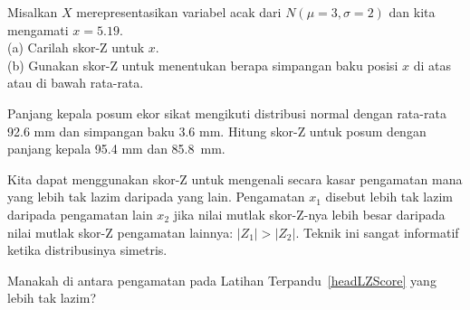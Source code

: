 \begin{exercisewrap}
\begin{nexercise}
Misalkan $X$ merepresentasikan variabel acak dari
$N(\mu=3, \sigma=2)$ dan kita mengamati $x=5.19$. \\
(a)
    Carilah skor-Z untuk $x$. \\
(b)
    Gunakan skor-Z untuk menentukan berapa simpangan baku posisi $x$
    di atas atau di bawah rata-rata.\footnotemark{}
\end{nexercise}
\end{exercisewrap}

\begin{exercisewrap}
\begin{nexercise} \label{headLZScore}
Panjang kepala posum ekor sikat mengikuti distribusi normal
dengan rata-rata 92.6 mm dan simpangan baku 3.6 mm.
Hitung skor-Z untuk posum dengan panjang kepala 95.4 mm
dan 85.8~mm.\footnotemark{}
\end{nexercise}
\end{exercisewrap}

Kita dapat menggunakan skor-Z untuk mengenali secara kasar
pengamatan mana yang lebih tak lazim daripada yang lain.
Pengamatan $x_1$ disebut lebih tak lazim daripada pengamatan lain $x_2$
jika nilai mutlak skor-Z-nya lebih besar daripada nilai mutlak
skor-Z pengamatan lainnya: $|Z_1| > |Z_2|$.
Teknik ini sangat informatif ketika distribusinya simetris.


\begin{exercisewrap}
\begin{nexercise}
Manakah di antara pengamatan pada Latihan Terpandu~\ref{headLZScore}
yang lebih tak lazim?\footnotemark{}
\end{nexercise}
\end{exercisewrap}


